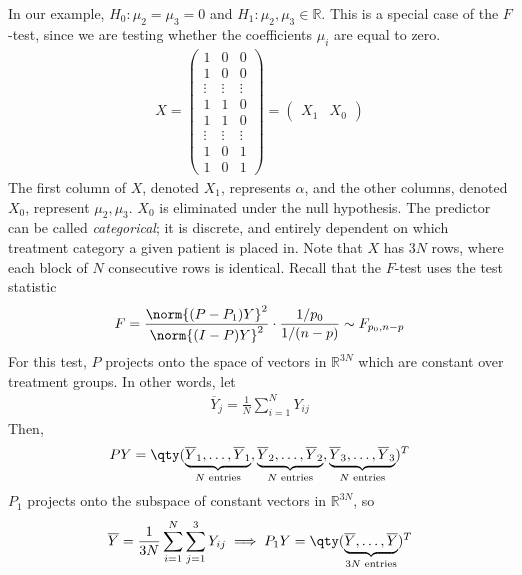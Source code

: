 In our example, $H_0 \colon \mu_2 = \mu_3 = 0$ and $H_1 \colon \mu_2, \mu_3 \in \mathbb R$.
This is a special case of the $F$-test, since we are testing whether the coefficients $\mu_i$ are equal to zero.
\begin{align*}
	X = \begin{pmatrix}
		1      & 0      & 0      \\
		1      & 0      & 0      \\
		\vdots & \vdots & \vdots \\
		1      & 1      & 0      \\
		1      & 1      & 0      \\
		\vdots & \vdots & \vdots \\
		1      & 0      & 1      \\
		1      & 0      & 1
	\end{pmatrix} = \begin{pmatrix}
		X_1 & X_0
	\end{pmatrix}
\end{align*}
The first column of $X$, denoted $X_1$, represents $\alpha$, and the other columns, denoted $X_0$, represent $\mu_2, \mu_3$.
$X_0$ is eliminated under the null hypothesis.
The predictor can be called \textit{categorical}; it is discrete, and entirely dependent on which treatment category a given patient is placed in.
Note that $X$ has $3N$ rows, where each block of $N$ consecutive rows is identical.
Recall that the $F$-test uses the test statistic
\begin{align*}
	F = \frac{\norm{(P-P_1)Y}^2}{\norm{(I-P)Y}^2} \cdot \frac{1/p_0}{1/(n-p)} \sim F_{p_0,n-p}
\end{align*}
For this test, $P$ projects onto the space of vectors in $\mathbb R^{3N}$ which are constant over treatment groups.
In other words, let
\begin{align*}
	\overline Y_j = \frac{1}{N} \sum_{i=1}^N Y_{ij}
\end{align*}
Then,
\begin{align*}
	P Y = \qty( \underbrace{\overline Y_1, \dots, \overline Y_1}_{N \text{ entries}}, \underbrace{\overline Y_2, \dots, \overline Y_2}_{N \text{ entries}}, \underbrace{\overline Y_3, \dots, \overline Y_3}_{N \text{ entries}} )^\tran
\end{align*}
$P_1$ projects onto the subspace of constant vectors in $\mathbb R^{3N}$, so
\begin{align*}
	\overline Y = \frac{1}{3N} \sum_{i=1}^N \sum_{j=1}^3 Y_{ij} \implies P_1 Y = \qty( \underbrace{\overline Y, \dots, \overline Y}_{3N \text{ entries}} )^\tran
\end{align*}
